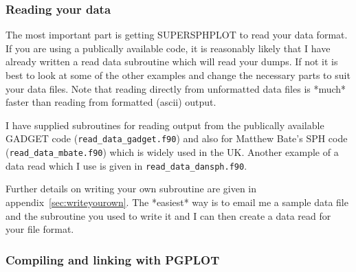 \documentclass[a4paper,11pt]{article}
\begin{document}
\subsubsection{Reading your data}
 The most important part is getting SUPERSPHPLOT to read your data format.
If you are using a publically available code, it is reasonably likely that I
have already written a read data subroutine which will read your dumps.
If not it is best to look at some of the other examples and change the 
necessary parts to suit your data files. Note that reading directly from
unformatted data files is *much* faster than reading from formatted (ascii)
output.   

I have supplied subroutines for reading output from the publically available
GADGET code (\verb+read_data_gadget.f90+) and also for Matthew Bate's SPH code
(\verb+read_data_mbate.f90+) which is widely used in the UK. Another example of a
data read which I use is given in \verb+read_data_dansph.f90+.

Further details on writing your own subroutine are given in
appendix~\ref{sec:writeyourown}. The *easiest* way is to email me a sample data file and the subroutine
you used to write it and I can then create a data read for your file format.

\subsubsection{Compiling and linking with PGPLOT}
\end{document}
